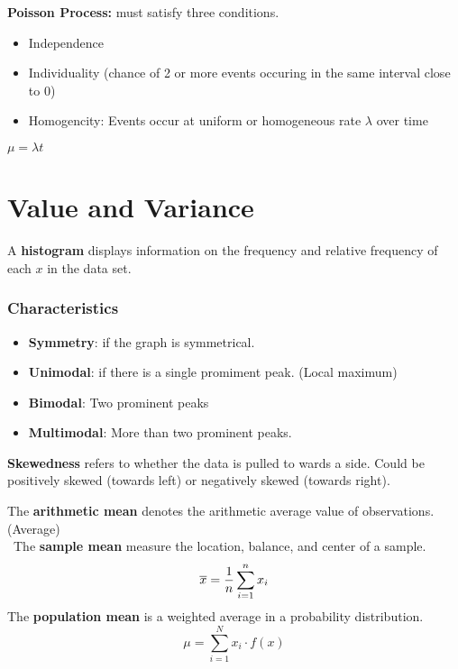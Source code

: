 \documentclass[english, 12pt]{article}
\begin{document}
\begin{defn}
\textbf{Poisson Process:} must satisfy three conditions.
\begin{itemize}
\item Independence
\item Individuality (chance of 2 or more events occuring in the same interval close to 0)
\item Homogencity: Events occur at uniform or homogeneous rate $\lambda$ over time
\end{itemize}
$\mu = \lambda t$
\end{defn}

\section{Value and Variance}

\begin{defn}
A \textbf{histogram} displays information on the frequency and relative frequency of each $x$ in the data set.
\end{defn}

\subsubsection*{Characteristics}
\begin{itemize}
\item \textbf{Symmetry}: if the graph is symmetrical.
\item \textbf{Unimodal}: if there is a single promiment peak. (Local maximum)
\item \textbf{Bimodal}: Two prominent peaks
\item \textbf{Multimodal}: More than two prominent peaks.
\end{itemize}

\begin{defn}
\textbf{Skewedness} refers to whether the data is pulled to wards a side. Could be positively skewed (towards left) or negatively skewed (towards right).
\end{defn}

\begin{defn}
The \textbf{arithmetic mean} denotes the arithmetic average value of observations. (Average)\\\
The \textbf{sample mean} measure the location, balance, and center of a sample.
\[\overline{x} = \frac{1}{n} \sum_{i=1}^n x_{i}\]
The \textbf{population mean} is a weighted average in a probability distribution.
\[ \mu = \sum_{i=1}^N x_{i} \cdot f(x)\]
\end{defn}
\end{document}
